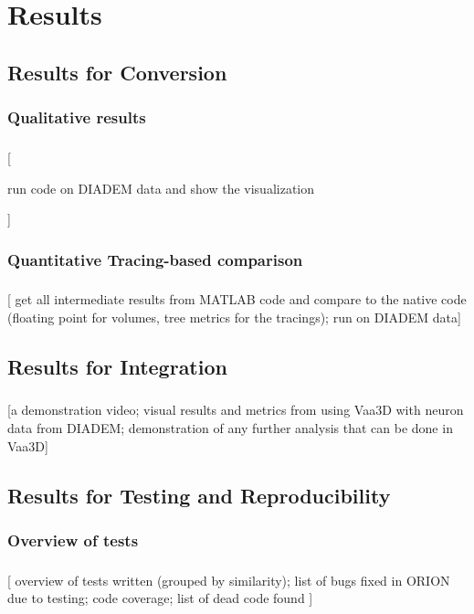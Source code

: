\documentclass{beamer}
\newcommand{\tmetrics}[1]{#1}
\newcommand{\tmetrics}[1]{\textcolor{tmetrics}{#1}}
\begin{document}
\section{Results}

\subsection{Results for Conversion}

\subsubsection{Qualitative results}
\begin{frame}\frametitle{\subsecname}
	[
		\tmetrics{
			run code on DIADEM data and show the
			visualization
		}
	]
\end{frame}

\subsubsection{Quantitative Tracing-based comparison}
\begin{frame}\frametitle{\subsecname}
	[ get all intermediate results from MATLAB code and
	compare to the native code (floating point for volumes,
	tree metrics for the tracings); run on DIADEM data]
\end{frame}

\subsection{Results for Integration}
\begin{frame}\frametitle{\subsecname}
	[\tmetrics{a demonstration video; visual results and metrics from using
			Vaa3D with neuron data from DIADEM; demonstration of any further analysis
	that can be done in Vaa3D}]

\end{frame}

\subsection{Results for Testing and Reproducibility}

\subsubsection{Overview of tests}
\begin{frame}\frametitle{\subsubsecname}
	[
		overview of tests written (grouped by similarity);
		list of bugs fixed in ORION due to testing;
		code coverage; list of dead code found
	]
\end{frame}
\end{document}
